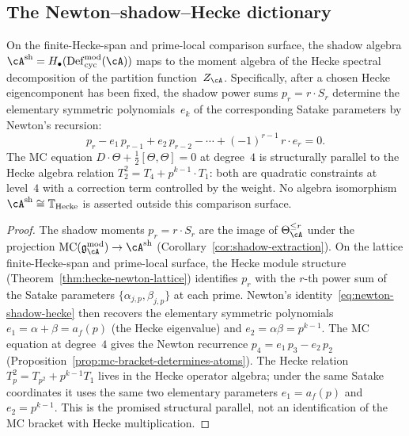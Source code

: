 \subsection{The Newton--shadow--Hecke dictionary}

\begin{proposition}%
\label{prop:newton-shadow-hecke}%
\ClaimStatusConditional%
%
%
On the finite-Hecke-span and prime-local comparison surface, the
shadow algebra
$\cA^{\mathrm{sh}} =
H_\bullet(\operatorname{Def}^{\mathrm{mod}}_{\mathrm{cyc}}(\cA))$
maps to the moment algebra of the Hecke spectral decomposition of
the partition function~$Z_\cA$. Specifically, after a chosen
Hecke eigencomponent has been fixed, the shadow power sums
$p_r = r\cdot S_r$ determine the elementary symmetric
polynomials~$e_k$ of the corresponding Satake parameters by Newton's
recursion:
\begin{equation}\label{eq:newton-shadow-hecke}
 p_r - e_1\,p_{r-1} + e_2\,p_{r-2} - \cdots
 + (-1)^{r-1}\,r\cdot e_r = 0.
\end{equation}
The MC equation $D\cdot\Theta + \tfrac12[\Theta,\Theta] = 0$
at degree~$4$ is structurally parallel to the Hecke algebra
relation $T_2^2 = T_4 + p^{k-1}\cdot T_1$: both are
quadratic constraints at level~$4$ with a correction term
controlled by the weight.
No algebra isomorphism
$\cA^{\mathrm{sh}}\cong\mathbb T_{\mathrm{Hecke}}$ is asserted
outside this comparison surface.
\end{proposition}

\begin{proof}
The shadow moments $p_r = r\cdot S_r$ are the image of
$\Theta_\cA^{\le r}$ under the projection
$\operatorname{MC}(\mathfrak{g}^{\mathrm{mod}}_\cA) \to
\cA^{\mathrm{sh}}$
(Corollary~\ref{cor:shadow-extraction}).
On the lattice finite-Hecke-span and prime-local surface, the Hecke
module structure
(Theorem~\ref{thm:hecke-newton-lattice}) identifies
$p_r$ with the $r$-th power sum of the Satake parameters
$\{\alpha_{j,p}, \beta_{j,p}\}$ at each prime.
Newton's identity~\eqref{eq:newton-shadow-hecke} then
recovers the elementary symmetric polynomials
$e_1 = \alpha + \beta = a_f(p)$ (the Hecke eigenvalue)
and $e_2 = \alpha\beta = p^{k-1}$.
The MC equation at degree~$4$ gives the Newton recurrence
$p_4 = e_1\,p_3 - e_2\,p_2$
(Proposition~\ref{prop:mc-bracket-determines-atoms}).
The Hecke relation $T_p^2=T_{p^2}+p^{k-1}T_1$ lives in the Hecke
operator algebra; under the same Satake coordinates it uses the same
two elementary parameters \(e_1=a_f(p)\) and \(e_2=p^{k-1}\).
This is the promised structural parallel, not an identification of
the MC bracket with Hecke multiplication.
\end{proof}

